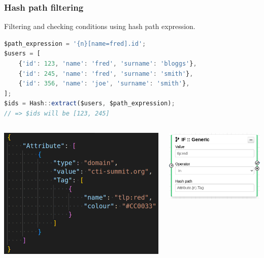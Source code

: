 \begin{frame}[fragile]
    \frametitle{Hash path filtering}
Filtering and checking conditions using hash path expression.
\begin{lstlisting}[language=javascript,firstnumber=1]
$path_expression = '{n}[name=fred].id';
$users = [
    {'id': 123, 'name': 'fred', 'surname': 'bloggs'},
    {'id': 245, 'name': 'fred', 'surname': 'smith'},
    {'id': 356, 'name': 'joe', 'surname': 'smith'},
];
$ids = Hash::extract($users, $path_expression);
// => $ids will be [123, 245]
\end{lstlisting}
\begin{columns}
    \begin{column}{0.6\textwidth}
        \begin{center}
            \includegraphics[width=0.7\linewidth]{pictures/attribute-json.png}
        \end{center}
    \end{column}
    \begin{column}{0.4\textwidth}
        \includegraphics[width=1.0\linewidth]{pictures/module-if-generic.png}
    \end{column}
\end{columns}
\end{frame}

